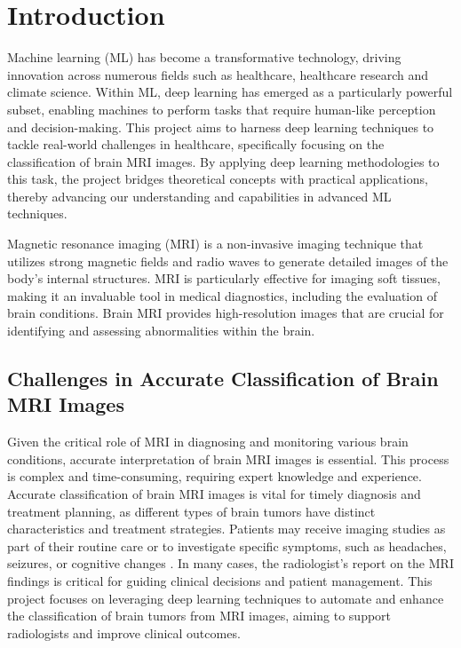 \section{Introduction}\label{s:introduction}

Machine learning (ML) has become a transformative technology, driving innovation across numerous fields such as healthcare\cite{nazar_systematic_2021}, healthcare research \cite{doupe_machine_2019} and climate science\cite{rolnick_tackling_2022}. Within ML, deep learning has emerged as a particularly powerful subset, enabling machines to perform tasks that require human-like perception and decision-making. This project aims to harness deep learning techniques to tackle real-world challenges in healthcare, specifically focusing on the classification of brain MRI images. By applying deep learning methodologies to this task, the project bridges theoretical concepts with practical applications, thereby advancing our understanding and capabilities in advanced ML techniques.

Magnetic resonance imaging (MRI) is a non-invasive imaging technique that utilizes strong magnetic fields and radio waves to generate detailed images of the body's internal structures. MRI is particularly effective for imaging soft tissues, making it an invaluable tool in medical diagnostics, including the evaluation of brain conditions. Brain MRI provides high-resolution images that are crucial for identifying and assessing abnormalities within the brain.

\subsection{Challenges in Accurate Classification of Brain MRI Images}\label{s:problem_statement}
Given the critical role of MRI in diagnosing and monitoring various brain conditions, accurate interpretation of brain MRI images is essential. This process is complex and time-consuming, requiring expert knowledge and experience. Accurate classification of brain MRI images is vital for timely diagnosis and treatment planning, as different types of brain tumors have distinct characteristics and treatment strategies. Patients may receive imaging studies as part of their routine care or to investigate specific symptoms, such as headaches, seizures, or cognitive changes \cite{lapointe_primary_2018}. In many cases, the radiologist's report on the MRI findings is critical for guiding clinical decisions and patient management. This project focuses on leveraging deep learning techniques to automate and enhance the classification of brain tumors from MRI images, aiming to support radiologists and improve clinical outcomes.

